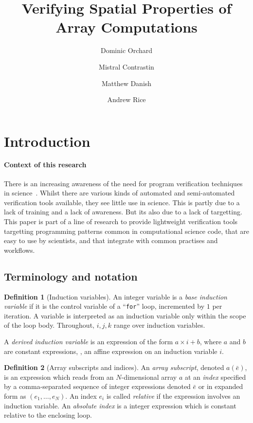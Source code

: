 \documentclass[acmlarge,review,anonymous]{acmart}\settopmatter{printfolios=true}
\title{Verifying Spatial Properties of Array Computations}
\author{Dominic Orchard}
\affiliation{
  \department{School of Computing}
  \institution{University of Kent}
}
\author{Mistral Contrastin}
\affiliation{
  \department{Computer Laboratory}
  \institution{University of Cambridge}
}
\author{Matthew Danish}
\affiliation{
  \department{Computer Laboratory}
  \institution{University of Cambridge}
}
\author{Andrew Rice}
\affiliation{
  \department{Computer Laboratory}
  \institution{University of Cambridge}
}
\theoremstyle{definition}
\newtheorem{defn}{Definition}
\theoremstyle{plain}
\theoremstyle{remark}
\begin{document}
\maketitle

\section{Introduction}

\paragraph{Context of this research}

There is an increasing awareness of the need for program verification
techniques in
science~\cite{post2005computational,oberkampf2010verification,orchard2014computational}.
Whilst there are various kinds of automated and semi-automated
verification tools available, they see little use in science. This is
partly due to a lack of training and a lack of awareness. But its also
due to a lack of targetting. This paper is part of a line of research
to provide lightweight verification tools targetting
programming patterns common in computational science code, 
that are easy to use by scientists, and that integrate with common
practises and workflows.


\subsection{Terminology and notation}

\begin{defn}[Induction variables]
  An integer variable is a \emph{base induction variable} if it is the control
  variable of a ``\texttt{for}'' loop, incremented by $1$ per iteration. A variable
  is interpreted as an induction variable only within the scope of the loop
  body. Throughout, $i, j, k$ range over induction variables.

  A \emph{derived induction variable} is an expression of the form $a \times i
  + b$, where $a$ and $b$ are constant expressions, \ie{}, an affine expression
  on an induction variable $i$.
\end{defn}

\begin{defn}[Array subscripts and indices]
  An \emph{array subscript}, denoted $a(\bar{e})$, is an expression which reads
  from an $N$-dimensional array $a$ at an \emph{index} specified by a
  comma-separated sequence of integer expressions denoted $\bar{e}$ or in
  expanded form as $(e_1, \ldots, e_N)$. An index $e_i$ is called
  \emph{relative} if the expression involves an induction variable. An
  \emph{absolute index} is a integer expression which is constant relative to
  the enclosing loop.
\end{defn}
\end{document}
